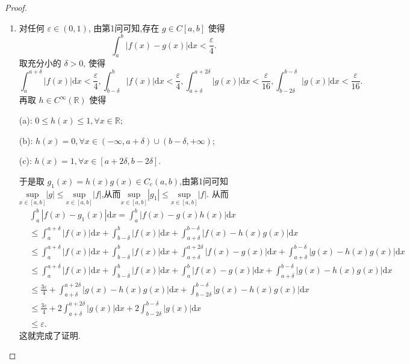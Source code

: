 \documentclass[../../main.tex]{subfiles}
\begin{document}
\begin{proof}
\begin{enumerate}[(1)]
\item 对任何 $\varepsilon \in (0,1)$, 由第1问可知,存在 $g \in C[a,b]$ 使得
\[
\int_{a}^{b} |f(x) - g(x)|\mathrm{d}x < \frac{\varepsilon}{4}.
\]
取充分小的 $\delta > 0$, 使得
\[
\int_{a}^{a + \delta} |f(x)|\mathrm{d}x < \frac{\varepsilon}{4}, \int_{b - \delta}^{b} |f(x)|\mathrm{d}x < \frac{\varepsilon}{4}, \int_{a + \delta}^{a + 2\delta} |g(x)|\mathrm{d}x < \frac{\varepsilon}{16}, \int_{b - 2\delta}^{b - \delta} |g(x)|\mathrm{d}x < \frac{\varepsilon}{16}.
\]
再取 $h \in C^{\infty}(\mathbb{R})$ 使得

(a): $0 \leqslant h(x) \leqslant 1, \forall x \in \mathbb{R}$;

(b): $h(x) = 0, \forall x \in (-\infty,a + \delta) \cup (b - \delta,+\infty)$;

(c): $h(x) = 1, \forall x \in [a + 2\delta,b - 2\delta]$.

于是取 $g_1(x) = h(x)g(x) \in C_c(a,b)$,由第1问可知$\underset{x\in \left[ a,b \right]}{\mathrm{sup}}\left| g \right|\leqslant \underset{x\in \left[ a,b \right]}{\mathrm{sup}}\left| f \right|$,从而$\underset{x\in \left[ a,b \right]}{\mathrm{sup}}\left| g_1 \right|\leqslant \underset{x\in \left[ a,b \right]}{\mathrm{sup}}\left| f \right|$.
从而
\begin{align*}
&\int_{a}^{b} |f(x) - g_1(x)|\mathrm{d}x = \int_{a}^{b} |f(x) - g(x)h(x)|\mathrm{d}x \\
&\leqslant \int_{a}^{a + \delta} |f(x)|\mathrm{d}x + \int_{b - \delta}^{b} |f(x)|\mathrm{d}x + \int_{a + \delta}^{b - \delta} |f(x) - h(x)g(x)|\mathrm{d}x \\
&\leqslant \int_{a}^{a + \delta} |f(x)|\mathrm{d}x + \int_{b - \delta}^{b} |f(x)|\mathrm{d}x + \int_{a + \delta}^{a + 2\delta} |f(x) - g(x)|\mathrm{d}x + \int_{a + \delta}^{b - \delta} |g(x) - h(x)g(x)|\mathrm{d}x \\
&\leqslant \int_{a}^{a + \delta} |f(x)|\mathrm{d}x + \int_{b - \delta}^{b} |f(x)|\mathrm{d}x + \int_{a}^{b} |f(x) - g(x)|\mathrm{d}x + \int_{a + \delta}^{b - \delta} |g(x) - h(x)g(x)|\mathrm{d}x \\
&\leqslant \frac{3\varepsilon}{4} + \int_{a + \delta}^{a + 2\delta} |g(x) - h(x)g(x)|\mathrm{d}x + \int_{b - 2\delta}^{b - \delta} |g(x) - h(x)g(x)|\mathrm{d}x \\
&\leqslant \frac{3\varepsilon}{4} + 2 \int_{a + \delta}^{a + 2\delta} |g(x)|\mathrm{d}x + 2 \int_{b - 2\delta}^{b - \delta} |g(x)|\mathrm{d}x \\
&\leqslant \varepsilon.
\end{align*}
这就完成了证明.


\end{enumerate}
\end{proof}
\end{document}
